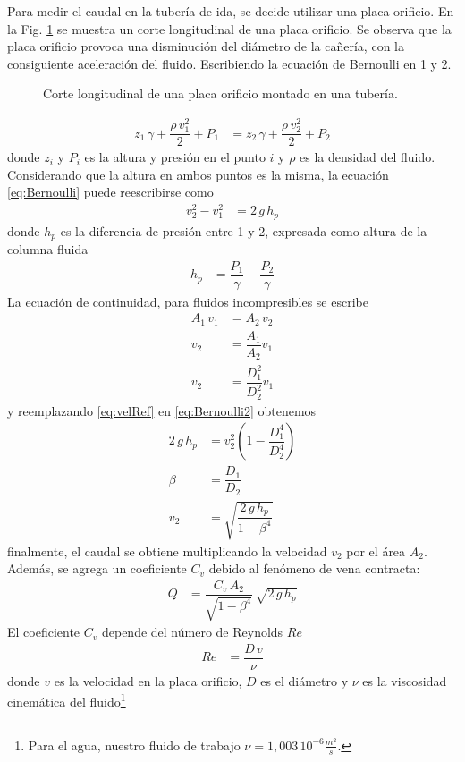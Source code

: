 Para medir el caudal en la tubería de ida, se decide
utilizar una placa orificio.
En la Fig. \ref{fig:placaOrificio} se muestra un corte longitudinal de una placa
orificio.
Se observa que la placa orificio provoca una disminución del diámetro
de la cañería, con la consiguiente aceleración del fluido.
Escribiendo la ecuación de Bernoulli en 1 y 2.

\begin{figure}
 \centering
 \caption{Corte longitudinal de una placa orificio montado en una tubería.}
 \label{fig:placaOrificio}
\end{figure}

\begin{align}
 z_1 \, \gamma + \dfrac{\rho \,v_1^2}{2} + P_1 &= z_2 \, \gamma + \dfrac{\rho \,v_2^2}{2} + P_2
\label{eq:Bernoulli}
\end{align}
donde $z_i$ y $P_i$ es la altura y presión en el punto $i$ y $\rho$ es 
la densidad del fluido. 
Considerando que la altura en ambos puntos es la misma, la ecuación
\eqref{eq:Bernoulli} puede reescribirse como
\begin{align}
 v_2^2 - v_1^2 &= 2\,g\,h_p
 \label{eq:Bernoulli2}
\end{align}
donde $h_p$ es la diferencia de presión entre 1 y 2, expresada como 
altura de la columna fluida
\begin{align}
 h_p &= \dfrac{P_1}{\gamma}-\dfrac{P_2}{\gamma}
\end{align}
La ecuación de continuidad, para fluidos incompresibles se escribe
\begin{align}
 A_1\,v_1 &= A_2\,v_2 \\
 v_2 &= \dfrac{A_1}{A_2} v_1 \\
 v_2 &= \dfrac{D_1^2}{D_2^2} v_1
 \label{eq:velRef}
\end{align}
y reemplazando \eqref{eq:velRef} en \eqref{eq:Bernoulli2} obtenemos
\begin{align}
 2 \, g \, h_p &= v_2^2 \left( 1 - \dfrac{D_1^4}{D_2^4} \right)\\
 \beta &= \dfrac{D_1}{D_2}\\
 v_2 &= \sqrt{\dfrac{2 \, g \, h_p}{1-\beta^4}}
\end{align}
finalmente, el caudal se obtiene multiplicando la velocidad $v_2$ por el
área $A_2$.
Además, se agrega un coeficiente $C_v$ debido al fenómeno de vena contracta:
\begin{align}
 Q &= \dfrac{C_v \, A_2}{\sqrt{1-\beta^4}}\, \sqrt{2 \, g \, h_p}
 \label{eq:placaOrif1}
\end{align}
El coeficiente $C_v$ depende del número de Reynolds $Re$ \cite{bib:Mataix, bib:ApuntesPuglesiPlacaOrif}
\begin{align}
Re &= \dfrac{D\,v}{\nu}
\end{align}
donde $v$ es la velocidad en la placa orificio, $D$ es el diámetro y ${\nu}$
es la viscosidad cinemática del fluido\footnote{Para el agua, nuestro fluido de
trabajo $\nu = 1,003\,10^{-6} \frac{m^2}{s}$.}

